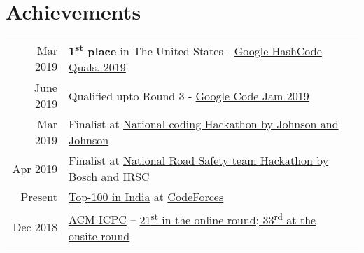 \documentclass[]{deedy-resume-openfont}
\begin{document}
\begin{minipage}[t]{0.66\textwidth}
\section{Achievements} 
\begin{tabular}{rll}
Mar 2019 & \textbf{1\textsuperscript{st} place} in The United States - \href{https://codingcompetitions.withgoogle.com/hashcode}{Google HashCode Quals. 2019}\\
June 2019 & Qualified upto Round 3 - \href{https://codingcompetitions.withgoogle.com/codejam}{Google Code Jam 2019} \\
Mar 2019 & Finalist at \href{https://www.hackerearth.com/challenges/competitive/3-address-code-on-site-hackathon-finals/leaderboard/}{National coding Hackathon by Johnson and Johnson} \\
Apr 2019 & Finalist at \href{http://ww2.road-safety.co.in/hackathon/}{National Road Safety team Hackathon by Bosch and IRSC} \\
Present & \href{https://codeforces.com/ratings/country/India}{Top-100 in India} at \href{https://codeforces.com}{CodeForces} \\
Dec 2018 & \href{https://icpc.baylor.edu/}{ACM-ICPC} -- \href{https://icpc.baylor.edu/ICPCID/NME4VU9K41BQ}{21\textsuperscript{st} in the online round; 33\textsuperscript{rd} at the onsite round} \\
\end{tabular}
\sectionsep

\end{minipage} 
\end{document}
